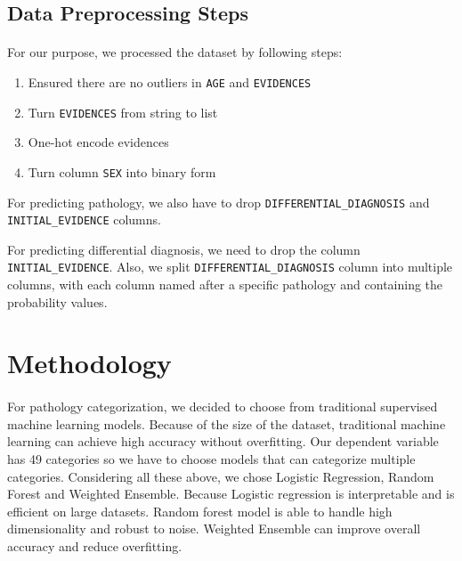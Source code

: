 \documentclass{article}
\begin{document}
\subsection{Data Preprocessing Steps}
\paragraph{ }
For our purpose, we processed the dataset by following steps:
\begin{enumerate}
\setlength{\itemindent}{2em} 
\item Ensured there are no outliers in \verb|AGE| and \verb|EVIDENCES|
\item Turn \verb|EVIDENCES| from string to list
\item One-hot encode evidences
\item Turn column \verb|SEX| into binary form
\end{enumerate}

For predicting pathology, we also have to drop \verb|DIFFERENTIAL_DIAGNOSIS| and \verb|INITIAL_EVIDENCE| columns.

For predicting differential diagnosis, we need to drop the column \verb|INITIAL_EVIDENCE|. Also, we split \verb|DIFFERENTIAL_DIAGNOSIS| column into multiple columns, with each column named after a specific pathology and containing the probability values.

\section{Methodology}

\paragraph{ }
For pathology categorization, we decided to choose from traditional supervised machine learning models. Because of the size of the dataset, traditional machine learning can achieve high accuracy without overfitting. Our dependent variable has 49 categories so we have to choose models that can categorize multiple categories. Considering all these above, we chose Logistic Regression,  Random Forest and Weighted Ensemble. Because Logistic regression is interpretable and is efficient on large datasets. Random forest model is able to  handle high dimensionality and robust to noise. Weighted Ensemble can improve overall accuracy and reduce overfitting.
\end{document}
